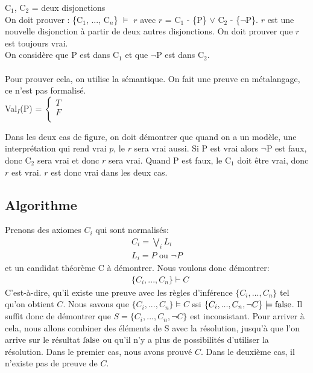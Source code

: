 \noindent C$_{1}$, C$_{2}$ = deux disjonctions \\

\noindent On doit prouver : \{C$_{1}$, ..., C$_{n}$\} $\models$ $r$ avec  $r$ = C$_{1}$ - \{P\} $\lor$ C$_{2}$ - \{$\lnot$P\}. $r$ est une nouvelle disjonction à partir de deux autres disjonctions. On doit prouver que $r$ est toujours vrai.\\

\noindent On considère que P est dans C$_{1}$ et que $\lnot$P est dans C$_{2}$.\\
\\
Pour prouver cela, on utilise la sémantique. On fait une preuve en métalangage, ce n'est pas formalisé. \\
Val$_{I}$(P) =
$\left\lbrace
\begin{array}{l}
T \\
F \\
\end{array}
\right.$ 

Dans les deux cas de figure, on doit démontrer que quand on a un modèle, une interprétation qui rend vrai $p$, le $r$ sera vrai aussi. Si P est vrai alors $\lnot$P est faux, donc C$_{2}$ sera vrai et donc $r$ sera vrai. Quand P est faux, le C$_{1}$ doit être vrai, donc $r$ est vrai. $r$ est donc vrai dans les deux cas. 

\subsection{Algorithme}

Prenons des axiomes $C_{i}$ qui sont normalisés:
\begin{align*}
C_{i} = \bigvee\limits_{i} L_{i} \\
L_{i} = P \mbox{ ou } \lnot P
\end{align*}
et un candidat théorème C à démontrer.
Nous voulons donc démontrer:
\begin{align*}
& \{C_{i}, ..., C_{n}\} \vdash C
\end{align*}
C'est-à-dire, qu'il existe une preuve avec les règles d'inférence $\{C_{i}, ..., C_{n}\}$ tel qu'on obtient $C$.
Nous savons que 
$\{C_{i}, ..., C_{n}\} \models C$ ssi $\{C_{i}, ..., C_{n}, \lnot C\} \models \mathrm{false}$.
Il suffit donc de démontrer que
$S = \{C_{i}, ..., C_{n}, \lnot C\}$ est inconsistant.
Pour arriver à cela, nous allons combiner des éléments de S avec la résolution,
jusqu'à que l'on arrive sur le résultat $\mathrm{false}$ ou qu'il n'y a plus de possibilités d'utiliser la résolution.
Dans le premier cas, nous avons prouvé $C$.
Dans le deuxième cas, il n'existe pas de preuve de $C$.

